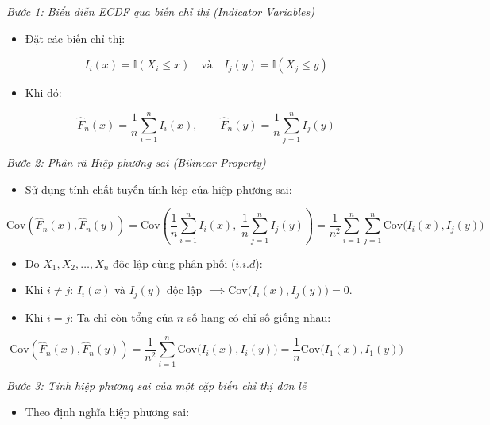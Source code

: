 \documentclass[12pt,a4paper]{article}
\begin{document}
\emph{Bước 1: Biểu diễn ECDF qua biến chỉ thị (Indicator Variables)}

\begin{itemize}

\item
  Đặt các biến chỉ thị:
\end{itemize}

\[I_i(x) = \mathbb{I}(X_i \le x) \quad \text{và} \quad I_j(y) = \mathbb{I}(X_j \le y)\]

\begin{itemize}

\item
  Khi đó:
\end{itemize}

\[\widehat{F}_n(x) = \frac{1}{n} \sum_{i=1}^n I_i(x), \qquad \widehat{F}_n(y) = \frac{1}{n} \sum_{j=1}^n I_j(y)\]

\emph{Bước 2: Phân rã Hiệp phương sai (Bilinear Property)}

\begin{itemize}

\item
  Sử dụng tính chất tuyến tính kép của hiệp phương sai:
\end{itemize}

\[\text{Cov}\left(\widehat{F}_n(x), \widehat{F}_n(y)\right) = \text{Cov}\left(\frac{1}{n}\sum_{i=1}^n I_i(x), \; \frac{1}{n}\sum_{j=1}^n I_j(y)\right) = \frac{1}{n^2} \sum_{i=1}^n \sum_{j=1}^n \text{Cov}\big(I_i(x), I_j(y)\big)\]

\begin{itemize}

\item
  Do \(X_1, X_2, \dots, X_n\) độc lập cùng phân phối (\(i.i.d\)):
\item
  Khi \(i \neq j\): \(I_i(x)\) và \(I_j(y)\) độc lập \(\implies \text{Cov}\big(I_i(x), I_j(y)\big) = 0\).
\item
  Khi \(i = j\): Ta chỉ còn tổng của \(n\) số hạng có chỉ số giống nhau:
\end{itemize}

\[\text{Cov}\left(\widehat{F}_n(x), \widehat{F}_n(y)\right) = \frac{1}{n^2} \sum_{i=1}^n \text{Cov}\big(I_i(x), I_i(y)\big) = \frac{1}{n} \text{Cov}\big(I_1(x), I_1(y)\big)\]

\emph{Bước 3: Tính hiệp phương sai của một cặp biến chỉ thị đơn lẻ}

\begin{itemize}

\item
  Theo định nghĩa hiệp phương sai:
\end{itemize}
\end{document}
